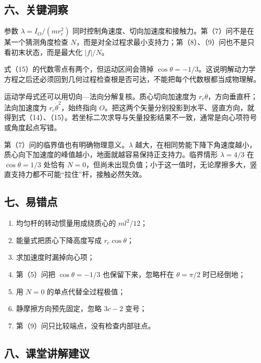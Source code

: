 \documentclass[12pt,a4paper,UTF8]{ctexart}
\newcommand{\tightlist}{\setlength{\itemsep}{0pt}\setlength{\parskip}{0pt}}
\begin{document}
\subsection{六、关键洞察}\label{ux516dux5173ux952eux6d1eux5bdf-6}

参数 \(\lambda=I_O/(mr_c^2)\)
同时控制角速度、切向加速度和接触力。第（7）问不是在某一个猜测角度检查
\(N\)，而是对全过程求最小支持力；第（8）、（9）问也不是只看初末状态，而是最大化
\(|f|/N\)。

式（15）的代数零点有两个，但运动区间会筛掉
\(\cos\theta=-1/3\)。这说明解动力学方程之后还必须回到几何过程检查根是否可达，不能把每个代数根都当成物理解。

运动学母式还可以用切向---法向分解复核。质心切向加速度为
\(r_c\ddot\theta\)，方向垂直杆；法向加速度为
\(r_c\dot\theta^2\)，始终指向
\(O\)。把这两个矢量分别投影到水平、竖直方向，就得到式（14）、（15）。若坐标二次求导与矢量投影结果不一致，通常是向心项符号或角度起点写错。

第（7）问的临界值也有明确物理意义。\(\lambda\)
越大，在相同势能下降下角速度越小，质心向下加速度的峰值越小，地面就越容易保持正支持力。临界情形
\(\lambda=4/3\) 在 \(\cos\theta=1/3\) 处恰有
\(N=0\)，但尚未出现负值；小于这一值时，无论摩擦多大，竖直支持力都不可能``拉住''杆，接触必然失效。

\subsection{七、易错点}\label{ux4e03ux6613ux9519ux70b9-6}

\begin{enumerate}
\def\labelenumi{\arabic{enumi}.}
\tightlist
\item
  均匀杆的转动惯量用成绕质心的 \(ml^2/12\)；
\item
  能量式把质心下降高度写成 \(r_c\cos\theta\)；
\item
  求加速度时漏掉向心项；
\item
  第（5）问把 \(\cos\theta=-1/3\) 也保留下来，忽略杆在 \(\theta=\pi/2\)
  时已经倒地；
\item
  用 \(N=0\) 的单点代替全过程极值；
\item
  静摩擦方向预先固定，忽略 \(3c-2\) 变号；
\item
  第（9）问只比较端点，没有检查内部驻点。
\end{enumerate}

\subsection{八、课堂讲解建议}\label{ux516bux8bfeux5802ux8bb2ux89e3ux5efaux8bae-6}
\end{document}
